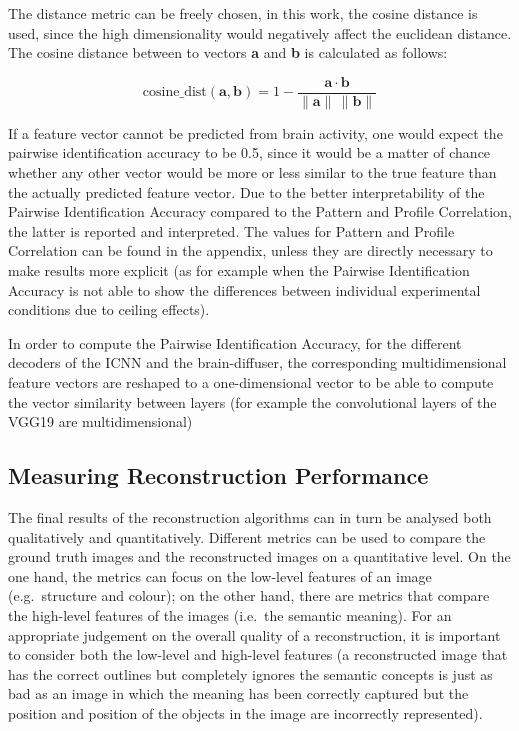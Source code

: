 The distance metric can be freely chosen, in this work, the cosine distance is used, since the high dimensionality would negatively affect the euclidean distance\cite{koppen2000curse}. The cosine distance between to vectors \textbf{a} and \textbf{b} is calculated as follows:

\[
\text{cosine\_dist}(\mathbf{a}, \mathbf{b}) = 1 - \frac{\mathbf{a} \cdot \mathbf{b}}{\|\mathbf{a}\| \, \|\mathbf{b}\|}
\]

If a feature vector cannot be predicted from brain activity, one would expect the pairwise identification accuracy to be 0.5, since it would be a matter of chance whether any other vector would be more or less similar to the true feature than the actually predicted feature vector. Due to the better interpretability of the Pairwise Identification Accuracy compared to the Pattern and Profile Correlation, the latter is reported and interpreted. The values for Pattern and Profile Correlation can be found in the appendix, unless they are directly necessary to make results more explicit (as for example when the Pairwise Identification Accuracy is not able to show the differences between individual experimental conditions due to ceiling effects).

In order to compute the Pairwise Identification Accuracy, for the different decoders of the ICNN and the brain-diffuser, the corresponding multidimensional feature vectors are reshaped to a one-dimensional vector to be able to compute the vector similarity between layers (for example the convolutional layers of the VGG19 are multidimensional)


\subsection{Measuring Reconstruction Performance}

The final results of the reconstruction algorithms can in turn be analysed both qualitatively and quantitatively. Different metrics can be used to compare the ground truth images and the reconstructed images on a quantitative level\cite{ozcelikNaturalSceneReconstruction2023}. On the one hand, the metrics can focus on the low-level features of an image (e.g.\ structure and colour); on the other hand, there are metrics that compare the high-level features of the images (i.e.\ the semantic meaning). For an appropriate judgement on the overall quality of a reconstruction, it is important to consider both the low-level and high-level features (a reconstructed image that has the correct outlines but completely ignores the semantic concepts is just as bad as an image in which the meaning has been correctly captured but the position and position of the objects in the image are incorrectly represented).

